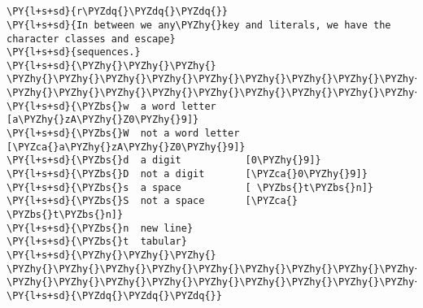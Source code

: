 

\section*{}

\begin{Verbatim}[commandchars=\\\{\}]
\PY{l+s+sd}{r\PYZdq{}\PYZdq{}\PYZdq{}}
\PY{l+s+sd}{In between we any\PYZhy{}key and literals, we have the character classes and escape}
\PY{l+s+sd}{sequences.}
\PY{l+s+sd}{\PYZhy{}\PYZhy{}\PYZhy{} \PYZhy{}\PYZhy{}\PYZhy{}\PYZhy{}\PYZhy{}\PYZhy{}\PYZhy{}\PYZhy{}\PYZhy{}\PYZhy{}\PYZhy{}\PYZhy{}\PYZhy{}\PYZhy{}\PYZhy{}\PYZhy{}\PYZhy{} \PYZhy{}\PYZhy{}\PYZhy{}\PYZhy{}\PYZhy{}\PYZhy{}\PYZhy{}\PYZhy{}\PYZhy{}\PYZhy{}\PYZhy{}\PYZhy{}}
\PY{l+s+sd}{\PYZbs{}w  a word letter     [a\PYZhy{}zA\PYZhy{}Z0\PYZhy{}9]}
\PY{l+s+sd}{\PYZbs{}W  not a word letter [\PYZca{}a\PYZhy{}zA\PYZhy{}Z0\PYZhy{}9]}
\PY{l+s+sd}{\PYZbs{}d  a digit           [0\PYZhy{}9]}
\PY{l+s+sd}{\PYZbs{}D  not a digit       [\PYZca{}0\PYZhy{}9]}
\PY{l+s+sd}{\PYZbs{}s  a space           [ \PYZbs{}t\PYZbs{}n]}
\PY{l+s+sd}{\PYZbs{}S  not a space       [\PYZca{} \PYZbs{}t\PYZbs{}n]}
\PY{l+s+sd}{\PYZbs{}n  new line}
\PY{l+s+sd}{\PYZbs{}t  tabular}
\PY{l+s+sd}{\PYZhy{}\PYZhy{}\PYZhy{} \PYZhy{}\PYZhy{}\PYZhy{}\PYZhy{}\PYZhy{}\PYZhy{}\PYZhy{}\PYZhy{}\PYZhy{}\PYZhy{}\PYZhy{}\PYZhy{}\PYZhy{}\PYZhy{}\PYZhy{}\PYZhy{}\PYZhy{} \PYZhy{}\PYZhy{}\PYZhy{}\PYZhy{}\PYZhy{}\PYZhy{}\PYZhy{}\PYZhy{}\PYZhy{}\PYZhy{}\PYZhy{}\PYZhy{}}
\PY{l+s+sd}{\PYZdq{}\PYZdq{}\PYZdq{}}
\end{Verbatim}
